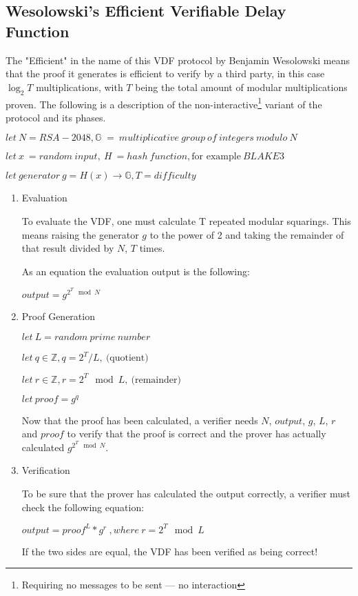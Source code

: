 \subsection{Wesolowski's Efficient Verifiable Delay Function}
The "Efficient" in the name of this VDF protocol by Benjamin Wesolowski means that the proof it generates is efficient to verify by a third party, in this case \( \log _{2} T \) multiplications, with \( T \) being the total amount of modular multiplications proven. The following is a description of the non-interactive\footnote{Requiring no messages to be sent --- no interaction} variant of the protocol and its phases.

\( let \: N = RSA-2048, \mathbb{G} \; = \: multiplicative \: group \: of \: integers \: modulo \: N \)

\( let \: x \: = random \: input,  \: H \: = hash \: function, \text{for example} \: BLAKE3 \)

\( let \: generator \: g = H(x) \to \mathbb{G}, T = difficulty \)
\begin{enumerate}
  \item{Evaluation}

  To evaluate the VDF, one must calculate T repeated modular squarings. This means raising the generator $g$ to the power of 2 and taking the remainder of that result divided by $N$, $T$ times.

  As an equation the evaluation output is the following:

  \( output = g^{2^{T} \mod N } \) 

  \item{Proof Generation}

  \( let \: L = random \: prime \: number \)

  \( let \: q \in \mathbb{Z}, q = 2^T/L, \: \text{(quotient)} \)

  \( let \: r \in \mathbb{Z}, r = 2^T\mod L, \: \text{(remainder)} \)

  \( let \: proof = g^q \) 

  Now that the proof has been calculated, a verifier needs $N$, $output$, $g$, $L$, $r$ and $proof$ to verify that the proof is correct and the prover has actually calculated $g^{2^{T} \mod N }$.

  \item{Verification}

  To be sure that the prover has calculated the output correctly, a verifier must check the following equation:

  \( output = proof^L * g^r \:, where \: r = 2^T \mod L \)

  If the two sides are equal, the VDF has been verified as being correct!
\end{enumerate}

